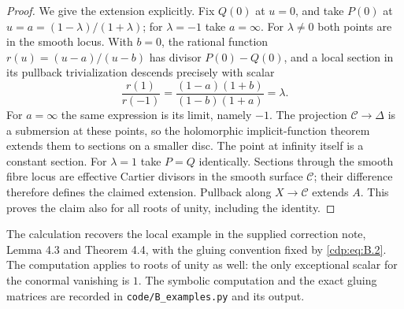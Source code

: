 \begin{proof}
We give the extension explicitly. Fix $Q(0)$ at $u=0$, and take $P(0)$ at $u=a=(1-\lambda)/(1+\lambda)$; for $\lambda=-1$ take $a=\infty$. For $\lambda\ne0$ both points are in the smooth locus. With $b=0$, the rational function $r(u)=(u-a)/(u-b)$ has divisor $P(0)-Q(0)$, and a local section in its pullback trivialization descends precisely with scalar
\[
 \frac{r(1)}{r(-1)}
 =\frac{(1-a)(1+b)}{(1-b)(1+a)}=\lambda.
\]
For $a=\infty$ the same expression is its limit, namely $-1$. The projection $\mathcal C\to\Delta$ is a submersion at these points, so the holomorphic implicit-function theorem extends them to sections on a smaller disc. The point at infinity itself is a constant section. For $\lambda=1$ take $P=Q$ identically. Sections through the smooth fibre locus are effective Cartier divisors in the smooth surface $\mathcal C$; their difference therefore defines the claimed extension. Pullback along $X\to\mathcal C$ extends $A$. This proves the claim also for all roots of unity, including the identity.
\end{proof}

The calculation recovers the local example in the supplied correction note, Lemma 4.3 and Theorem 4.4, with the gluing convention fixed by \eqref{cdp:eq:B.2}. The computation applies to roots of unity as well: the only exceptional scalar for the conormal vanishing is $1$. The symbolic computation and the exact gluing matrices are recorded in \texttt{code/B\_examples.py} and its output.


